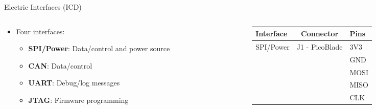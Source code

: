 
\begin{frame}{Electric Interfaces (ICD)}

    \begin{columns}[t]
        \begin{column}[t]{0.5\textwidth}
            \begin{itemize}
                \item Four interfaces:
                    \begin{itemize}
                        \item \textbf{SPI/Power}: Data/control and power source
                        \vspace{0.2cm}
                        \item \textbf{CAN}: Data/control
                        \vspace{0.2cm}
                        \item \textbf{UART}: Debug/log messages
                        \vspace{0.2cm}
                        \item \textbf{JTAG}: Firmware programming
                    \end{itemize}
            \end{itemize}
        \end{column}
        \begin{column}[t]{0.6\textwidth}
            \begin{table}[!htb]\tiny
                \centering
                \label{tab:icd}
                \begin{tabular}{lcl}
                    \toprule[1.5pt]
                    \textbf{Interface} & \textbf{Connector} & \textbf{Pins}\\
                    \midrule
                    \multirow{6}{*}{SPI/Power}    & \multirow{6}{*}{J1 - PicoBlade} & 3V3 \\
                                                  &                     & GND \\
                                                  &                     & MOSI \\
                                                  &                     & MISO \\
                                                  &                     & CLK \\

\end{tabular}
\end{table}
\end{column}
\end{columns}
\end{frame}
